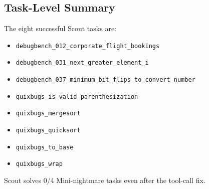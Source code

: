 \documentclass{article}
\begin{document}
\subsection{Task-Level Summary}

The eight successful Scout tasks are:
\begin{itemize}
    \item \texttt{debugbench\_012\_corporate\_flight\_bookings}
    \item \texttt{debugbench\_031\_next\_greater\_element\_i}
    \item \texttt{debugbench\_037\_minimum\_bit\_flips\_to\_convert\_number}
    \item \texttt{quixbugs\_is\_valid\_parenthesization}
    \item \texttt{quixbugs\_mergesort}
    \item \texttt{quixbugs\_quicksort}
    \item \texttt{quixbugs\_to\_base}
    \item \texttt{quixbugs\_wrap}
\end{itemize}

Scout solves 0/4 Mini-nightmare tasks even after the tool-call fix.
\end{document}

